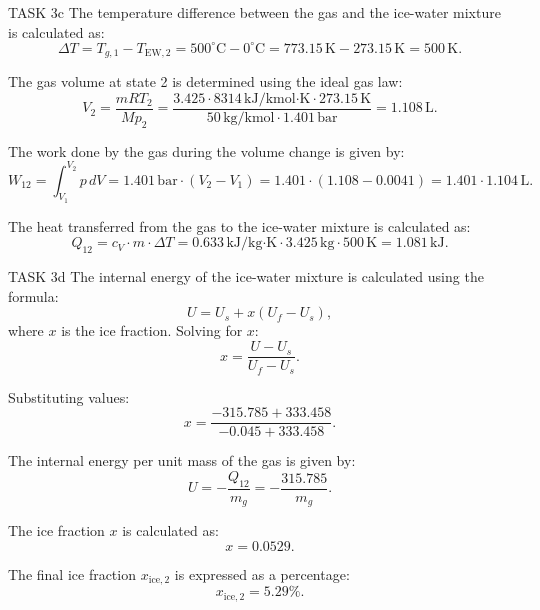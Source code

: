 TASK 3c  
The temperature difference between the gas and the ice-water mixture is calculated as:  
\[
\Delta T = T_{g,1} - T_{\text{EW},2} = 500^\circ\text{C} - 0^\circ\text{C} = 773.15 \, \text{K} - 273.15 \, \text{K} = 500 \, \text{K}.
\]

The gas volume at state 2 is determined using the ideal gas law:  
\[
V_2 = \frac{m R T_2}{M p_2} = \frac{3.425 \cdot 8314 \, \text{kJ/kmol·K} \cdot 273.15 \, \text{K}}{50 \, \text{kg/kmol} \cdot 1.401 \, \text{bar}} = 1.108 \, \text{L}.
\]

The work done by the gas during the volume change is given by:  
\[
W_{12} = \int_{V_1}^{V_2} p \, dV = 1.401 \, \text{bar} \cdot (V_2 - V_1) = 1.401 \cdot (1.108 - 0.0041) = 1.401 \cdot 1.104 \, \text{L}.
\]

The heat transferred from the gas to the ice-water mixture is calculated as:  
\[
Q_{12} = c_V \cdot m \cdot \Delta T = 0.633 \, \text{kJ/kg·K} \cdot 3.425 \, \text{kg} \cdot 500 \, \text{K} = 1.081 \, \text{kJ}.
\]

TASK 3d  
The internal energy of the ice-water mixture is calculated using the formula:  
\[
U = U_s + x (U_f - U_s),
\]
where \( x \) is the ice fraction. Solving for \( x \):  
\[
x = \frac{U - U_s}{U_f - U_s}.
\]

Substituting values:  
\[
x = \frac{-315.785 + 333.458}{-0.045 + 333.458}.
\]

The internal energy per unit mass of the gas is given by:  
\[
U = -\frac{Q_{12}}{m_g} = -\frac{315.785}{m_g}.
\]

The ice fraction \( x \) is calculated as:  
\[
x = 0.0529.
\]

The final ice fraction \( x_{\text{ice},2} \) is expressed as a percentage:  
\[
x_{\text{ice},2} = 5.29\%.
\]